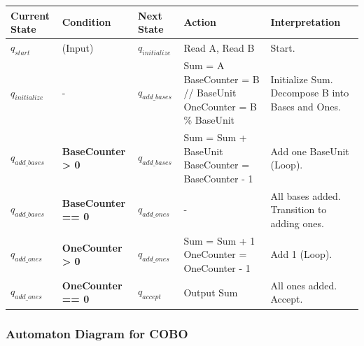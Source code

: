 \documentclass[11pt]{article}
\begin{document}
\begin{longtable}{|l|l|l|l|l|}
\hline
\textbf{Current State} & \textbf{Condition} & \textbf{Next State} & \textbf{Action} & \textbf{Interpretation} \\
\hline
\endhead
$q_{start}$ & (Input) & $q_{initialize}$ & Read A, Read B & Start. \\
\hline
$q_{initialize}$ & - & $q_{add\_bases}$ & Sum = A \newline BaseCounter = B // BaseUnit \newline OneCounter = B \% BaseUnit & Initialize Sum. Decompose B into Bases and Ones. \\
\hline
$q_{add\_bases}$ & \textbf{BaseCounter > 0} & $q_{add\_bases}$ & Sum = Sum + BaseUnit \newline BaseCounter = BaseCounter - 1 & Add one BaseUnit (Loop). \\
\hline
$q_{add\_bases}$ & \textbf{BaseCounter == 0} & $q_{add\_ones}$ & - & All bases added. Transition to adding ones. \\
\hline
$q_{add\_ones}$ & \textbf{OneCounter > 0} & $q_{add\_ones}$ & Sum = Sum + 1 \newline OneCounter = OneCounter - 1 & Add 1 (Loop). \\
\hline
$q_{add\_ones}$ & \textbf{OneCounter == 0} & $q_{accept}$ & Output Sum & All ones added. Accept. \\
\hline
\end{longtable}

\subsubsection*{Automaton Diagram for COBO}

\end{document}
